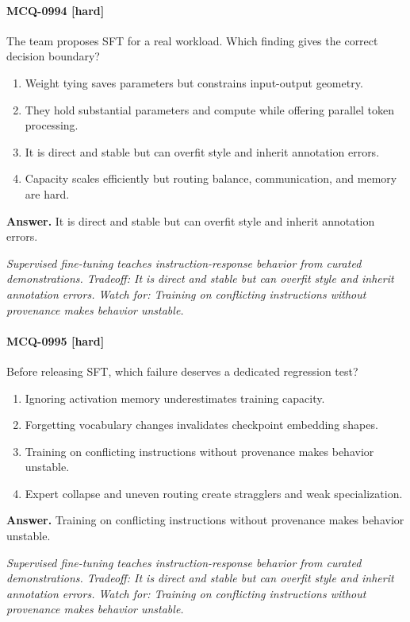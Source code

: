 \paragraph{MCQ-0994 [hard]} The team proposes SFT for a real workload. Which finding gives the correct decision boundary?
\begin{enumerate}[label=\Alph*.]
\item Weight tying saves parameters but constrains input-output geometry.
\item They hold substantial parameters and compute while offering parallel token processing.
\item It is direct and stable but can overfit style and inherit annotation errors.
\item Capacity scales efficiently but routing balance, communication, and memory are hard.
\end{enumerate}
\noindent\textbf{Answer.} It is direct and stable but can overfit style and inherit annotation errors.
\par\textit{Supervised fine-tuning teaches instruction-response behavior from curated demonstrations. Tradeoff: It is direct and stable but can overfit style and inherit annotation errors. Watch for: Training on conflicting instructions without provenance makes behavior unstable.}
\paragraph{MCQ-0995 [hard]} Before releasing SFT, which failure deserves a dedicated regression test?
\begin{enumerate}[label=\Alph*.]
\item Ignoring activation memory underestimates training capacity.
\item Forgetting vocabulary changes invalidates checkpoint embedding shapes.
\item Training on conflicting instructions without provenance makes behavior unstable.
\item Expert collapse and uneven routing create stragglers and weak specialization.
\end{enumerate}
\noindent\textbf{Answer.} Training on conflicting instructions without provenance makes behavior unstable.
\par\textit{Supervised fine-tuning teaches instruction-response behavior from curated demonstrations. Tradeoff: It is direct and stable but can overfit style and inherit annotation errors. Watch for: Training on conflicting instructions without provenance makes behavior unstable.}

